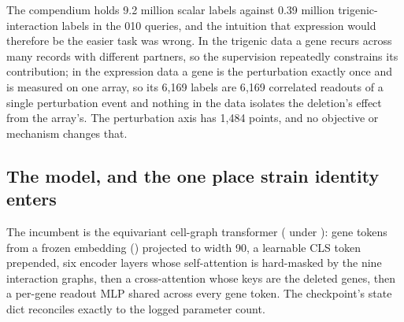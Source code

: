  The compendium holds 9.2 million scalar labels against
0.39 million trigenic-interaction labels in the 010 queries, and the intuition that
expression would therefore be the easier task was wrong. In the trigenic data a gene recurs
across many records with different partners, so the supervision repeatedly constrains its
contribution; in the expression data a gene is the perturbation exactly once and is
measured on one array, so its 6{,}169 labels are 6{,}169 correlated readouts of a single
perturbation event and nothing in the data isolates the deletion's effect from the array's.
The perturbation axis has 1{,}484 points, and no objective or mechanism changes that.

\subsection{The model, and the one place strain identity enters}
\label{sec:strand-model}

The incumbent is the equivariant cell-graph transformer
( under ): gene tokens from a frozen
embedding () projected to width 90, a learnable CLS token prepended, six
encoder layers whose self-attention is hard-masked by the nine interaction graphs, then a
cross-attention  whose keys are the deleted genes, then a
per-gene readout MLP shared across every gene token. The checkpoint's state dict
reconciles exactly to the logged parameter count.

